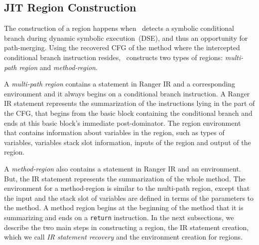 \subsection{JIT Region Construction}
\label{sec:jit}
The construction of a region happens when \tool\ detects a symbolic conditional branch
during dynamic symbolic execution~(DSE), and thus an opportunity for path-merging.
%
Using the recovered CFG of the method where the intercepted
conditional branch instruction resides, \toolshort\ constructs two types of regions: \textit{multi-path region} and
\textit{method-region}.

A \textit{multi-path region} contains a statement in Ranger IR and a corresponding environment and it always begins on
a conditional branch instruction.
%
A Ranger IR statement represents the summarization of the instructions lying in the part of the CFG, that begins from
the basic block containing the conditional branch and ends at this basic block\rq s immediate post-dominator.
%
The region environment that contains information about variables in the region, such as types of variables, variables
stack slot information, inputs of the region and output of the region.

A \textit{method-region} also contains a statement in Ranger IR and an environment.
%
But, the IR statement represents the summarization of the whole method.
%
The environment for a method-region is similar to the multi-path region, except that the input and the stack slot of
variables are defined in terms of the parameters to the method.
%
A method region begins at the beginning of the method that it is summarizing and ends on a {\tt return} instruction.
%
In the next subsections, we describe the two main steps in constructing a region, the IR statement creation,
which we call \textit{IR statement recovery} and the environment creation for regions.
